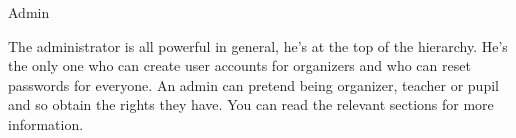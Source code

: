 \begin{section}{Admin}

    The administrator is all powerful in general, he's at the top of the hierarchy. 
		He's the only one who can create user accounts for organizers and who can reset passwords for everyone.
		An admin can pretend being organizer, teacher or pupil and so obtain the rights they have.
		You can read the relevant sections for more information.

\end{section}
